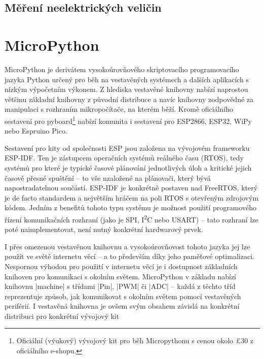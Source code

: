 
\subsection{Měření neelektrických veličin}

\section{MicroPython}
MicroPython je derivátem vysokoúrovňového skriptovacího programovacího jazyka Python určený pro běh na vestavěných systémech a dalších
aplikacích s nízkým výpočetním výkonem. Z hlediska vestavěné knihovny nabízí naprostou většinu základní knihovny z původní
distribuce a navíc knihovny zodpovědné za manipulaci s rozhraním mikropočítače, na kterém běží. Kromě oficiálního sestavení
pro pyboard\footnote{Oficiální (výukový) vývojový kit pro běh Micropythonu s cenou okolo \pounds30 z oficiálního e-shopu.}
nabízí komunita i sestavení pro ESP2866, ESP32, WiPy nebo Espruino Pico.

Sestavení pro kity od společnosti ESP jsou založena na vývojovém frameworku ESP-IDF.
Ten je zástupcem operačních systémů reálného času (RTOS), tedy systémů pro které je typické časové plánování jednotlivých úloh
a kritické jejich časově přesné spuštění -- to vše nzaložené na plánovači, který bývá napostradatelnou součástí. ESP-IDF
je konkrétně postaven nad FreeRTOS, který je de facto standardem a největším hráčem na poli RTOS s otevřeným zdrojovým kódem. 
Jedním z benefitů tohoto typu systému je možnost použití programového řízení komunikačních rozhraní
(jako je SPI, I\textsuperscript{2}C nebo USART) -- tato rozhraní lze poté naimplementovat, není nutný konkrétní hardwarový prvek.

I přes omezenou vestavěnou knihovnu a vysokoúrovňovost tohoto jazyka jej lze použít ve světě internetu věcí --
a to především díky jeho paměťové optimalizaci. Nespornou výhodou pro použití v internetu věcí je i dostupnost základních knihoven
pro komunikaci s okolním světem. MicroPython v základu nabízí knihovnu \ic|machine| s třídami \ic|Pin|, \ic|PWM| či \ic|ADC| --
každá z těchto tříd reprezentuje způsob, jak komunikovat s okolním světem pomocí vestavěných periférií. I vestavěná knihovna
je ovšem svým obsahem závislá na konkrétní distribuci pro konkrétní vývojový kit

